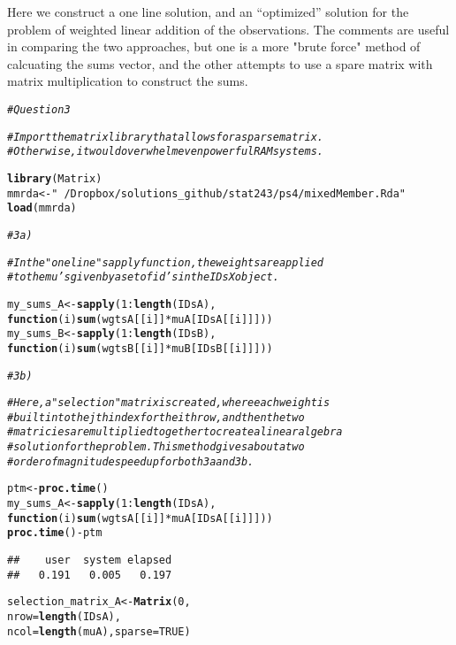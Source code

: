 \documentclass{article}\usepackage[]{graphicx}\usepackage[]{color}
\makeatletter
\newcommand{\hlnum}[1]{\textcolor[rgb]{0.686,0.059,0.569}{#1}}%
\newcommand{\hlstr}[1]{\textcolor[rgb]{0.192,0.494,0.8}{#1}}%
\newcommand{\hlcom}[1]{\textcolor[rgb]{0.678,0.584,0.686}{\textit{#1}}}%
\newcommand{\hlopt}[1]{\textcolor[rgb]{0,0,0}{#1}}%
\newcommand{\hlstd}[1]{\textcolor[rgb]{0.345,0.345,0.345}{#1}}%
\newcommand{\hlkwa}[1]{\textcolor[rgb]{0.161,0.373,0.58}{\textbf{#1}}}%
\newcommand{\hlkwb}[1]{\textcolor[rgb]{0.69,0.353,0.396}{#1}}%
\newcommand{\hlkwc}[1]{\textcolor[rgb]{0.333,0.667,0.333}{#1}}%
\newcommand{\hlkwd}[1]{\textcolor[rgb]{0.737,0.353,0.396}{\textbf{#1}}}%
\newenvironment{kframe}{%
 \def\at@end@of@kframe{}%
 \ifinner\ifhmode%
  \def\at@end@of@kframe{\end{minipage}}%
  \begin{minipage}{\columnwidth}%
 \fi\fi%
 \def\FrameCommand##1{\hskip\@totalleftmargin \hskip-\fboxsep
 \colorbox{shadecolor}{##1}\hskip-\fboxsep
     \hskip-\linewidth \hskip-\@totalleftmargin \hskip\columnwidth}%
 \MakeFramed {\advance\hsize-\width
   \@totalleftmargin\z@ \linewidth\hsize
   \@setminipage}}%
 {\par\unskip\endMakeFramed%
 \at@end@of@kframe}
\newenvironment{knitrout}{}{} %
\makeatother
\begin{document}
Here we construct a one line solution, and an ``optimized'' solution for the problem of weighted linear addition of the observations.  The comments are useful in comparing the two approaches, but one is a more "brute force" method of calcuating the sums vector, and the other attempts to use a spare matrix with matrix multiplication to construct the sums.

\begin{knitrout}
\color{fgcolor}\begin{kframe}
\begin{alltt}
\hlcom{# Question 3}

\hlcom{# Import the matrix library that allows for a sparse matrix.}
\hlcom{# Otherwise, it would overwhelm even powerful RAM systems.}

\hlkwd{library}\hlstd{(Matrix)}
\hlstd{mmrda} \hlkwb{<-} \hlstr{"~/Dropbox/solutions_github/stat243/ps4/mixedMember.Rda"}
\hlkwd{load}\hlstd{(mmrda)}

\hlcom{# 3a)}

\hlcom{# In the "one line" sapply function, the weights are applied}
\hlcom{# to the mu's given by a set of id's in the IDsX object.}

\hlstd{my_sums_A} \hlkwb{<-} \hlkwd{sapply}\hlstd{(}\hlnum{1}\hlopt{:}\hlkwd{length}\hlstd{(IDsA),}
                    \hlkwa{function}\hlstd{(}\hlkwc{i}\hlstd{)} \hlkwd{sum}\hlstd{(wgtsA[[i]]} \hlopt{*} \hlstd{muA[IDsA[[i]]]))}
\hlstd{my_sums_B} \hlkwb{<-} \hlkwd{sapply}\hlstd{(}\hlnum{1}\hlopt{:}\hlkwd{length}\hlstd{(IDsB),}
                    \hlkwa{function}\hlstd{(}\hlkwc{i}\hlstd{)} \hlkwd{sum}\hlstd{(wgtsB[[i]]} \hlopt{*} \hlstd{muB[IDsB[[i]]]))}

\hlcom{# 3b)}

\hlcom{# Here, a "selection" matrix is created, where each weight is}
\hlcom{# built into the jth index for the ith row, and then the two }
\hlcom{# matricies are multiplied together to create a linear algebra}
\hlcom{# solution for the problem.  This method gives about a two }
\hlcom{# order of magnitude speed up for both 3a and 3b.}

\hlstd{ptm} \hlkwb{<-} \hlkwd{proc.time}\hlstd{()}
\hlstd{my_sums_A} \hlkwb{<-} \hlkwd{sapply}\hlstd{(}\hlnum{1}\hlopt{:}\hlkwd{length}\hlstd{(IDsA),}
                    \hlkwa{function}\hlstd{(}\hlkwc{i}\hlstd{)} \hlkwd{sum}\hlstd{(wgtsA[[i]]} \hlopt{*} \hlstd{muA[IDsA[[i]]]))}
\hlkwd{proc.time}\hlstd{()} \hlopt{-} \hlstd{ptm}
\end{alltt}
\begin{verbatim}
##    user  system elapsed 
##   0.191   0.005   0.197
\end{verbatim}
\begin{alltt}
\hlstd{selection_matrix_A} \hlkwb{<-} \hlkwd{Matrix}\hlstd{(}\hlnum{0}\hlstd{,}
                             \hlkwc{nrow}\hlstd{=}\hlkwd{length}\hlstd{(IDsA),}
                             \hlkwc{ncol}\hlstd{=}\hlkwd{length}\hlstd{(muA),}\hlkwc{sparse}\hlstd{=}\hlnum{TRUE}\hlstd{)}


\end{alltt}
\end{kframe}
\end{knitrout}
\end{document}
